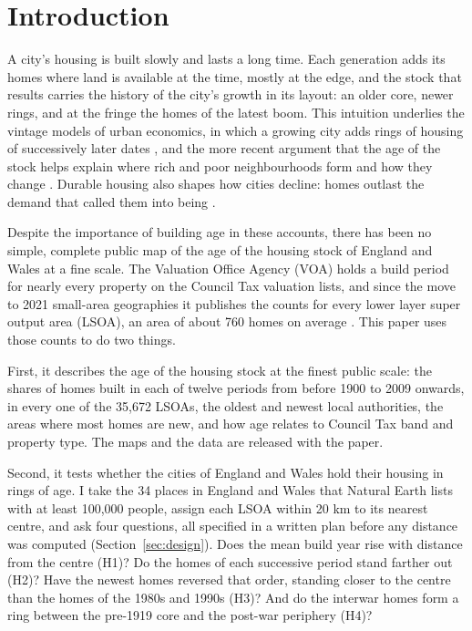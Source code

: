 \documentclass[11pt,a4paper]{article}
\begin{document}
\section{Introduction}
\label{sec:intro}
A city's housing is built slowly and lasts a long time. Each generation adds its homes where land is available at the time, mostly at the edge, and the stock that results carries the history of the city's growth in its layout: an older core, newer rings, and at the fringe the homes of the latest boom. This intuition underlies the vintage models of urban economics, in which a growing city adds rings of housing of successively later dates \citep{harrison1974,brueckner1980,wheaton1982,braid2001}, and the more recent argument that the age of the stock helps explain where rich and poor neighbourhoods form and how they change \citep{rosenthal2008,brueckner2009,rosenthal2015}. Durable housing also shapes how cities decline: homes outlast the demand that called them into being \citep{glaeser2005}.

Despite the importance of building age in these accounts, there has been no simple, complete public map of the age of the housing stock of England and Wales at a fine scale. The Valuation Office Agency (VOA) holds a build period for nearly every property on the Council Tax valuation lists, and since the move to 2021 small-area geographies it publishes the counts for every lower layer super output area (LSOA), an area of about 760 homes on average \citep{voa2025,voa2025bg}. This paper uses those counts to do two things.

First, it describes the age of the housing stock at the finest public scale: the shares of homes built in each of twelve periods from before 1900 to 2009 onwards, in every one of the 35,672 LSOAs, the oldest and newest local authorities, the areas where most homes are new, and how age relates to Council Tax band and property type. The maps and the data are released with the paper.

Second, it tests whether the cities of England and Wales hold their housing in rings of age. I take the 34 places in England and Wales that Natural Earth lists with at least 100,000 people, assign each LSOA within 20 km to its nearest centre, and ask four questions, all specified in a written plan before any distance was computed (Section~\ref{sec:design}). Does the mean build year rise with distance from the centre (H1)? Do the homes of each successive period stand farther out (H2)? Have the newest homes reversed that order, standing closer to the centre than the homes of the 1980s and 1990s (H3)? And do the interwar homes form a ring between the pre-1919 core and the post-war periphery (H4)?
\end{document}
